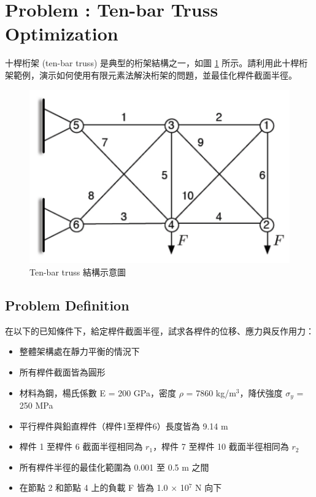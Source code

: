 \documentclass[12pt, a4paper]{article}
\begin{document}
\cfoot{\thepage}
\tableofcontents\thispagestyle{fancy}

\section{Problem : Ten-bar Truss Optimization}
十桿桁架 (ten-bar truss) 是典型的桁架結構之一，如圖 \ref{f:structure} 所示。請利用此十桿桁架範例，演示如何使用有限元素法解決桁架的問題，並最佳化桿件截面半徑。
\begin{figure}[h]
    \centering
    \includegraphics[width=12cm]{./pic/ten bar truss}
    \caption{Ten-bar truss 結構示意圖}
    \label{f:structure}
\end{figure}

\subsection*{Problem Definition}
在以下的已知條件下，給定桿件截面半徑，試求各桿件的位移、應力與反作用力：
\begin{itemize}
    \item 整體架構處在靜力平衡的情況下
    \item 所有桿件截面皆為圓形
    \item 材料為鋼，楊氏係數 E = 200 GPa，密度 $\rho$ = 7860 kg/m$^3$，降伏強度 $\sigma_y$ = 250 MPa
    \item 平行桿件與鉛直桿件（桿件1至桿件6）長度皆為 9.14 m
    \item 桿件 1 至桿件 6 截面半徑相同為 $r_1$，桿件 7 至桿件 10 截面半徑相同為 $r_2$
    \item 所有桿件半徑的最佳化範圍為 0.001 至 0.5 m 之間
    \item 在節點 2 和節點 4 上的負載 F 皆為 1.0 × 10$^7$ N 向下
\end{itemize}
\end{document}
